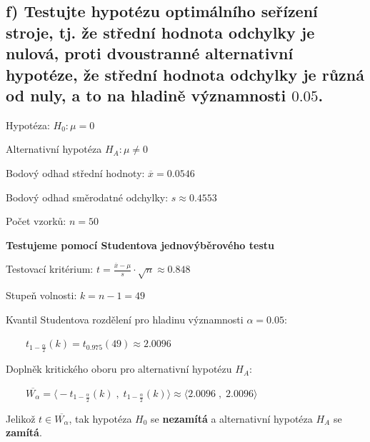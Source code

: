 \documentclass[11pt, a4paper, titlepage]{article}
\begin{document}
\noindent\makebox[\linewidth]{\rule{\paperwidth}{0.3pt}}


\subsection*{f) Testujte hypotézu optimálního seřízení stroje, tj. že střední hodnota odchylky je nulová, proti dvoustranné alternativní hypotéze, že střední hodnota odchylky je různá od nuly, a to na hladině významnosti $0.05$.}
\medskip



Hypotéza: ${\displaystyle H_0 : \mu = 0}$
\medskip

Alternativní hypotéza ${\displaystyle H_{A} : \mu \neq 0}$
\medskip

Bodový odhad střední hodnoty: ${\displaystyle \overline{x} = 0.0546}$
\medskip

Bodový odhad směrodatné odchylky: ${\displaystyle s \approx 0.4553}$
\medskip

Počet vzorků: ${\displaystyle n = 50}$
\bigskip
\smallskip



\textbf{Testujeme pomocí Studentova jednovýběrového testu}
\medskip

Testovací kritérium: ${\displaystyle t = \frac{\overline{x} - \mu}{s} \cdot \sqrt{n} \approx 0.848}$
\medskip

Stupeň volnosti: ${\displaystyle k = n - 1 = 49}$
\medskip

Kvantil Studentova rozdělení pro hladinu významnosti ${\displaystyle \alpha = 0.05}$:
\medskip

${\displaystyle \qquad t_{1 - \frac{\alpha}{2}}(k) = t_{0.975}(49) \approx 2.0096}$
\medskip

Doplněk kritického oboru pro alternativní hypotézu ${\displaystyle H_{A}}$:
\medskip

${\displaystyle \qquad \overline{W_\alpha} = \big\langle -t_{1 - \frac{\alpha}{2}}(k) \;,\; t_{1 - \frac{\alpha}{2}}(k) \big\rangle \approx \big\langle 2.0096 \;,\; 2.0096 \big\rangle}$
\bigskip
\smallskip



Jelikož ${\displaystyle t \in \overline{W_\alpha}}$, tak hypotéza ${\displaystyle H_0}$ se \textbf{nezamítá} a alternativní hypotéza ${\displaystyle H_A}$ se \textbf{zamítá}.
\bigskip

\newpage

\end{document}
